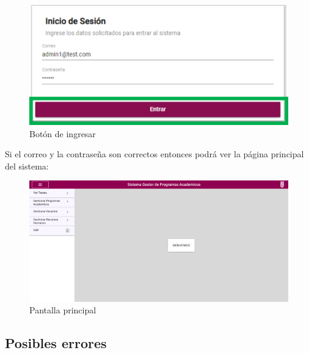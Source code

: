         \begin{figure}[!hbtp]
            \centering
            \hypertarget{BotonIng}{\includegraphics[width=0.5\linewidth]{images/SP5/BotonIngresar}}
            \caption{Botón de ingresar}
        \end{figure}
        
        Si el correo y la contraseña son correctos entonces podrá ver la página principal del sistema:
    
        \begin{figure}[!hbtp]
            \centering
            \hypertarget{Principal}{\includegraphics[width=0.7\linewidth]{images/SP5/Principal}}
            \caption{Pantalla principal}
        \end{figure}
        
        \clearpage
        \subsection{Posibles errores}
        
